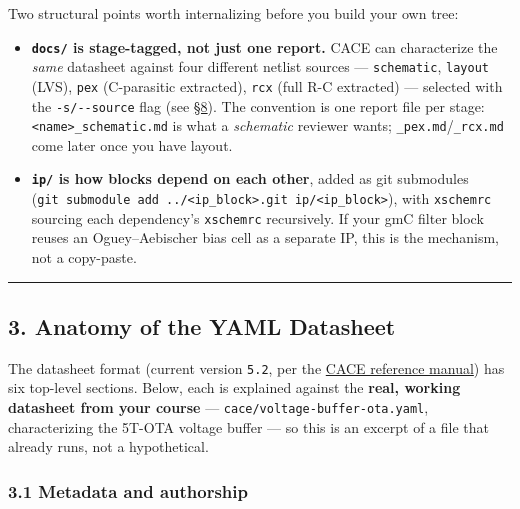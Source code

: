 \documentclass[
]{article}
\providecommand{\tightlist}{%
  \setlength{\itemsep}{0pt}\setlength{\parskip}{0pt}}
\begin{document}
Two structural points worth internalizing before you build your own
tree:

\begin{itemize}
\tightlist
\item
  \textbf{\texttt{docs/} is stage-tagged, not just one report.} CACE can
  characterize the \emph{same} datasheet against four different netlist
  sources --- \texttt{schematic}, \texttt{layout} (LVS), \texttt{pex}
  (C-parasitic extracted), \texttt{rcx} (full R-C extracted) ---
  selected with the \texttt{-s/-\/-source} flag (see
  \protect\hyperlink{8-post-layout-characterization}{§8}). The
  convention is one report file per stage:
  \texttt{\textless{}name\textgreater{}\_schematic.md} is what a
  \emph{schematic} reviewer wants; \texttt{\_pex.md}/\texttt{\_rcx.md}
  come later once you have layout.
\item
  \textbf{\texttt{ip/} is how blocks depend on each other}, added as git
  submodules
  (\texttt{git\ submodule\ add\ ../\textless{}ip\_block\textgreater{}.git\ ip/\textless{}ip\_block\textgreater{}}),
  with \texttt{xschemrc} sourcing each dependency's \texttt{xschemrc}
  recursively. If your gmC filter block reuses an Oguey--Aebischer bias
  cell as a separate IP, this is the mechanism, not a copy-paste.
\end{itemize}

\begin{center}\rule{0.5\linewidth}{0.5pt}\end{center}

\hypertarget{anatomy-of-the-yaml-datasheet}{%
\subsection{3. Anatomy of the YAML
Datasheet}\label{anatomy-of-the-yaml-datasheet}}

The datasheet format (current version \texttt{5.2}, per the
\href{https://cace.readthedocs.io/en/latest/reference/datasheet_format.html}{CACE
reference manual}) has six top-level sections. Below, each is explained
against the \textbf{real, working datasheet from your course} ---
\texttt{cace/voltage-buffer-ota.yaml}, characterizing the 5T-OTA voltage
buffer --- so this is an excerpt of a file that already runs, not a
hypothetical.

\hypertarget{metadata-and-authorship}{%
\subsubsection{3.1 Metadata and
authorship}\label{metadata-and-authorship}}
\end{document}
